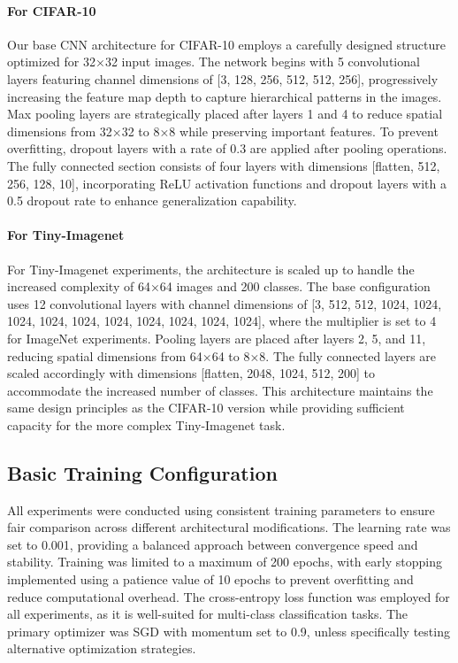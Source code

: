 \documentclass{article}
\begin{document}
\paragraph{For CIFAR-10}

Our base CNN architecture for CIFAR-10 employs a carefully designed structure optimized for 32×32 input images. The network begins with 5 convolutional layers featuring channel dimensions of [3, 128, 256, 512, 512, 256], progressively increasing the feature map depth to capture hierarchical patterns in the images. Max pooling layers are strategically placed after layers 1 and 4 to reduce spatial dimensions from 32×32 to 8×8 while preserving important features. To prevent overfitting, dropout layers with a rate of 0.3 are applied after pooling operations. The fully connected section consists of four layers with dimensions [flatten, 512, 256, 128, 10], incorporating ReLU activation functions and dropout layers with a 0.5 dropout rate to enhance generalization capability.

\paragraph{For Tiny-Imagenet}

For Tiny-Imagenet experiments, the architecture is scaled up to handle the increased complexity of 64×64 images and 200 classes. The base configuration uses 12 convolutional layers with channel dimensions of [3, 512, 512, 1024, 1024, 1024, 1024, 1024, 1024, 1024, 1024, 1024, 1024], where the multiplier is set to 4 for ImageNet experiments. Pooling layers are placed after layers 2, 5, and 11, reducing spatial dimensions from 64×64 to 8×8. The fully connected layers are scaled accordingly with dimensions [flatten, 2048, 1024, 512, 200] to accommodate the increased number of classes. This architecture maintains the same design principles as the CIFAR-10 version while providing sufficient capacity for the more complex Tiny-Imagenet task.

\subsection{Basic Training Configuration}

All experiments were conducted using consistent training parameters to ensure fair comparison across different architectural modifications. The learning rate was set to 0.001, providing a balanced approach between convergence speed and stability. Training was limited to a maximum of 200 epochs, with early stopping implemented using a patience value of 10 epochs to prevent overfitting and reduce computational overhead. The cross-entropy loss function was employed for all experiments, as it is well-suited for multi-class classification tasks. The primary optimizer was SGD with momentum set to 0.9, unless specifically testing alternative optimization strategies.
\end{document}
